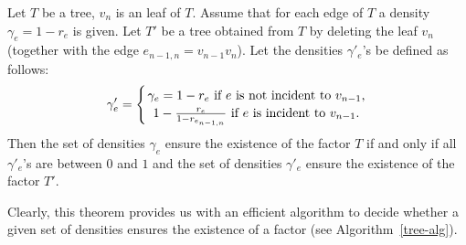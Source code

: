 \documentclass[12pt,a4paper]{amsart}
\numberwithin{equation}{section}
\begin{document}
\begin{theorem} \label{TT1} Let $T$ be a tree, $v_n$ is an leaf of
  $T$. Assume that for each edge of $T$ a density $\gamma_e=1-r_e$ is 
  given. Let $T'$ be a tree obtained from $T$ by deleting the leaf $v_n$
  (together with the edge $e_{n-1,n}=v_{n-1}v_n$). Let the densities
  $\gamma'_e$'s be defined as follows: 
$$\gamma'_e=\left\{ {\gamma_e=1-r_e \mbox{ if $e$ is not incident to $v_{n-1}$,}
    \atop     1-\frac{r_e}{1-r_{e_{n-1,n}}} \mbox{ if $e$ is incident
      to $v_{n-1}$.} }\right.$$
Then the set of densities $\gamma_e$ ensure the existence of the factor $T$ if
and only if all $\gamma'_e$'s are between $0$ and $1$ and the set of densities
$\gamma'_e$ ensure the existence of the factor $T'$.
\end{theorem}

\begin{remark} Clearly, this theorem provides us with an efficient algorithm to
  decide whether a given set of densities ensures the existence of a factor (see
  Algorithm~\ref{tree-alg}).
\end{remark}
\end{document}
